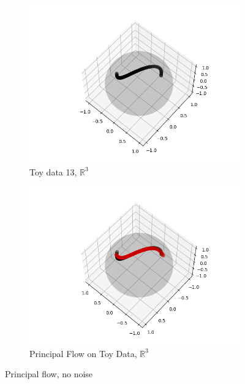 \documentclass[12pt]{report}
\begin{document}
\begin{figure}[ht]
    \centering
    \begin{subfigure}{.5\textwidth}
        \centering
        \includegraphics[scale=0.5]{Data_13.png}
        \caption{Toy data 13, $\mathbb{R}^3$}
        \label{fig:toydata}
    \end{subfigure}%
    \begin{subfigure}{.5\textwidth}
        \centering
        \includegraphics[scale=0.5]{single_flow_13.png}
        \caption{Principal Flow on Toy Data, $\mathbb{R}^3$}
        \label{fig:pflowtoy}
    \end{subfigure}
    \caption{Principal flow, no noise}
    \label{fig:nonnoiseflows}
\end{figure}
\end{document}
